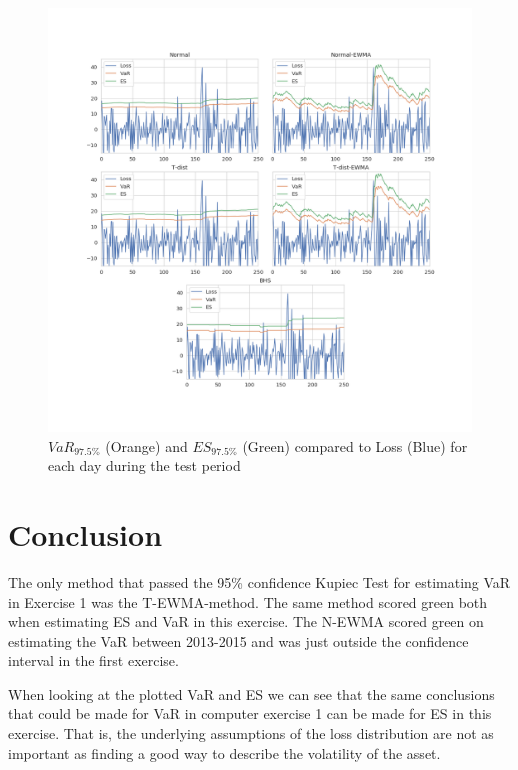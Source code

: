 \documentclass[a4paper]{article}
\begin{document}
\begin{figure}[h]
    \includegraphics[width=\textwidth]{plot.png}
    \caption{$VaR_{97.5\%}$ (Orange) and $ES_{97.5\%}$ (Green) compared to Loss (Blue) for each day during the test period}
    \label{var2}
\end{figure}

\section{Conclusion}
The only method that passed the 95\% confidence Kupiec Test for estimating VaR in Exercise 1 was the T-EWMA-method. The same method scored green both when estimating ES and VaR in this exercise. The N-EWMA scored green on estimating the VaR between 2013-2015 and was just outside the confidence interval in the first exercise. 

When looking at the plotted VaR and ES we can see that the same conclusions that could be made for VaR in computer exercise 1 can be made for ES in this exercise. That is, the underlying assumptions of the loss distribution are not as important as finding a good way to describe the volatility of the asset. 
\end{document}
